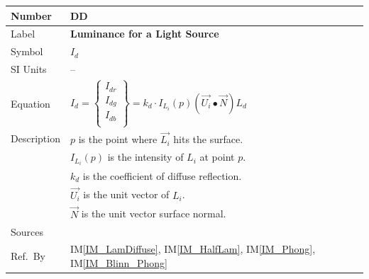 \documentclass[12pt]{article}
\newcommand{\colAwidth}{0.13\textwidth}
\newcommand{\colBwidth}{0.82\textwidth}
\newcounter{defnum} %
\newcounter{datadefnum} %
\newcommand{\iref}[1]{IM\ref{#1}}
\begin{document}
\noindent
\begin{minipage}{\textwidth}
	\renewcommand*{\arraystretch}{1.5}
	\begin{tabular}{| p{\colAwidth} | p{\colBwidth}|}
		\hline
		\rowcolor[gray]{0.9}
		Number& DD{datadefnum}\thedatadefnum 
		\label{DD_Intensity_diffuse}\\
		\hline
		Label& \bf Luminance for a Light Source\\
		\hline
		Symbol &$I_{d}$\\
		\hline
		SI Units & --\\
		\hline
		Equation&$I_{d} = \begin{Bmatrix}
		I_{dr} \\ I_{dg} \\ I_{db} \\
		\end{Bmatrix} = k_{d}\cdot I_{L_{i}}(p)(\vec{U_{i}}\bullet \vec{N}) 
		L_{d}$\\
		\hline
		Description & $p$ is the point where $\vec{L_{i}}$ hits the surface.
		\\
		& $I_{L_{i}}(p)$ is the intensity of $L_{i}$ at point $p$. \\
		& $k_{d}$ is the coefficient of diffuse reflection. \\
		& $\vec{U_{i}}$ is the unit vector of $L_{i}$. \\
		& $\vec{N}$ is the unit vector surface normal. \\
		\hline
		Sources& \cite{shreiner2012}\\
		\hline
		Ref.\ By & \iref{IM_LamDiffuse}, \iref{IM_HalfLam}, \iref{IM_Phong}, 
		\iref{IM_Blinn_Phong} \\
		\hline
	\end{tabular}
\end{minipage}\\

~\newline
\end{document}
